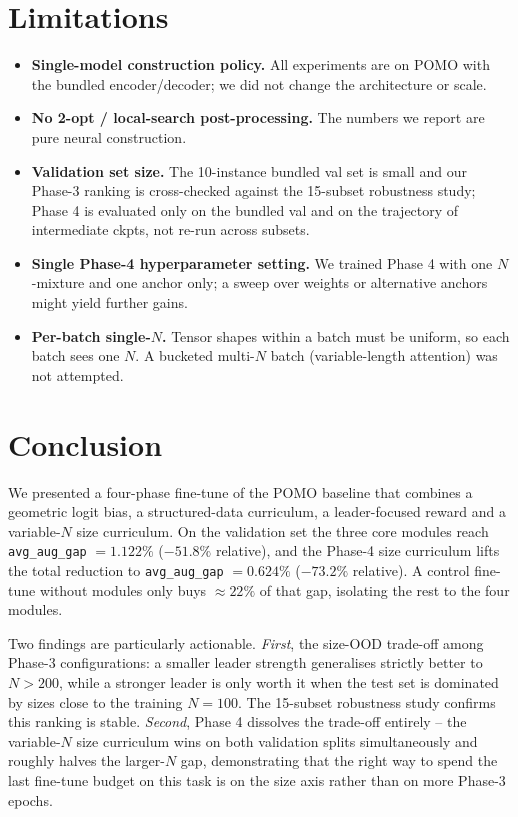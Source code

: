 \documentclass[11pt,a4paper]{article}
\begin{document}
\section{Limitations}
\label{sec:limit}

\begin{itemize}
  \item \textbf{Single-model construction policy.} All experiments are on
        POMO with the bundled encoder/decoder; we did not change the
        architecture or scale.
  \item \textbf{No 2-opt / local-search post-processing.} The numbers we
        report are pure neural construction.
  \item \textbf{Validation set size.} The 10-instance bundled val set
        is small and our Phase-3 ranking is cross-checked against the
        15-subset robustness study; Phase 4 is evaluated only on the
        bundled val and on the trajectory of intermediate ckpts, not
        re-run across subsets.
  \item \textbf{Single Phase-4 hyperparameter setting.} We trained Phase 4
        with one $N$-mixture and one anchor only; a sweep over weights
        or alternative anchors might yield further gains.
  \item \textbf{Per-batch single-$N$.} Tensor shapes within a batch must
        be uniform, so each batch sees one $N$. A bucketed multi-$N$
        batch (variable-length attention) was not attempted.
\end{itemize}

\section{Conclusion}
\label{sec:concl}

We presented a four-phase fine-tune of the POMO baseline that combines a
geometric logit bias, a structured-data curriculum, a leader-focused
reward and a variable-$N$ size curriculum. On the validation set the
three core modules reach \texttt{avg\_aug\_gap} $=1.122\%$ ($-51.8\%$
relative), and the Phase-4 size curriculum lifts the total reduction to
\texttt{avg\_aug\_gap} $=\mathbf{0.624\%}$ ($\mathbf{-73.2\%}$
relative). A control fine-tune without modules only buys $\approx 22\%$
of that gap, isolating the rest to the four modules.

Two findings are particularly actionable. \emph{First}, the size-OOD
trade-off among Phase-3 configurations: a smaller leader strength
generalises strictly better to $N>200$, while a stronger leader is only
worth it when the test set is dominated by sizes close to the training
$N=100$. The 15-subset robustness study confirms this ranking is stable.
\emph{Second}, Phase 4 dissolves the trade-off entirely -- the
variable-$N$ size curriculum wins on both validation splits
simultaneously and roughly halves the larger-$N$ gap, demonstrating that
the right way to spend the last fine-tune budget on this task is on the
size axis rather than on more Phase-3 epochs.
\end{document}
